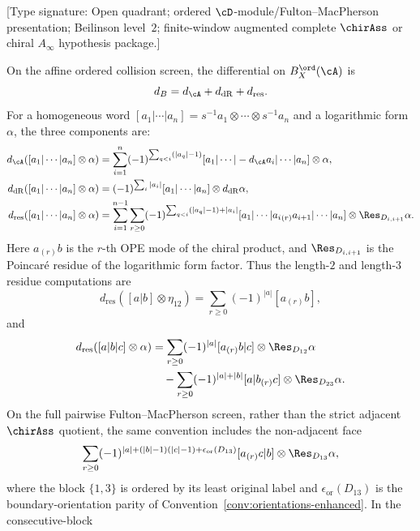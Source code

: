 \begin{proposition}
\label{prop:ordered-bar-local-differential-identities}
\textup{[Type signature: Open quadrant; ordered
$\cD$-module/Fulton--MacPherson presentation; Beilinson level~$2$;
finite-window augmented complete $\chirAss$ or chiral
$A_\infty$ hypothesis package.]}

On the affine ordered collision screen, the differential on
$B_X^{\ord}(\cA)$ is
\[
d_B=d_\cA+d_{\mathrm{dR}}+d_{\mathrm{res}}.
\]
For a homogeneous word
$[a_1|\cdots|a_n]=s^{-1}a_1\otimes\cdots\otimes s^{-1}a_n$
and a logarithmic form $\alpha$, the three components are:
\begin{align}
d_\cA([a_1|\cdots|a_n]\otimes\alpha)
&=
\sum_{i=1}^{n}
(-1)^{\sum_{q<i}(|a_q|-1)}
[a_1|\cdots|-d_\cA a_i|\cdots|a_n]\otimes\alpha,
\label{eq:ordered-bar-dA}\\
d_{\mathrm{dR}}([a_1|\cdots|a_n]\otimes\alpha)
&=
(-1)^{\sum_i |a_i|}
[a_1|\cdots|a_n]\otimes d_{\mathrm{dR}}\alpha,
\label{eq:ordered-bar-ddR}\\
d_{\mathrm{res}}([a_1|\cdots|a_n]\otimes\alpha)
&=
\sum_{i=1}^{n-1}\sum_{r\ge0}
(-1)^{\sum_{q<i}(|a_q|-1)+|a_i|}
[a_1|\cdots|a_i{}_{(r)}a_{i+1}|\cdots|a_n]
\otimes\Res_{D_{i,i+1}}\alpha .
\label{eq:ordered-bar-dres}
\end{align}
Here $a_{(r)}b$ is the $r$-th OPE mode of the chiral product, and
$\Res_{D_{i,i+1}}$ is the Poincar\'e residue of the logarithmic form
factor. Thus the length-$2$ and length-$3$ residue computations are
\[
d_{\mathrm{res}}([a|b]\otimes\eta_{12})
=
\sum_{r\ge0}(-1)^{|a|}[a_{(r)}b],
\]
and
\[
\begin{aligned}
d_{\mathrm{res}}([a|b|c]\otimes\alpha)
&=
\sum_{r\ge0}(-1)^{|a|}
[a_{(r)}b|c]\otimes\Res_{D_{12}}\alpha\\
&\quad
-\sum_{r\ge0}(-1)^{|a|+|b|}
[a|b_{(r)}c]\otimes\Res_{D_{23}}\alpha .
\end{aligned}
\]
On the full pairwise Fulton--MacPherson screen, rather than the
strict adjacent $\chirAss$ quotient, the same convention includes the
non-adjacent face
\[
\sum_{r\ge0}
(-1)^{|a|+(|b|-1)(|c|-1)+\epsilon_{\mathrm{or}}(D_{13})}
[a_{(r)}c|b]\otimes\Res_{D_{13}}\alpha,
\]
where the block $\{1,3\}$ is ordered by its least original label and
$\epsilon_{\mathrm{or}}(D_{13})$ is the boundary-orientation parity of
Convention~\ref{conv:orientations-enhanced}. In the consecutive-block

\end{proposition}
